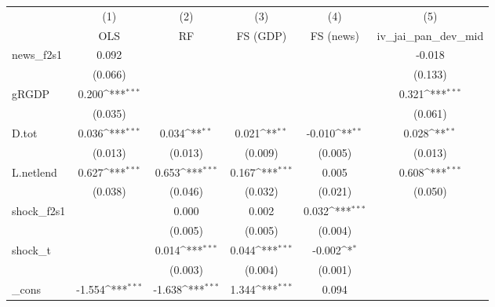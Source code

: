 {
\def\sym#1{\ifmmode^{#1}\else\(^{#1}\)\fi}
\begin{tabular}{l*{5}{c}}
\toprule
            &\multicolumn{1}{c}{(1)}&\multicolumn{1}{c}{(2)}&\multicolumn{1}{c}{(3)}&\multicolumn{1}{c}{(4)}&\multicolumn{1}{c}{(5)}\\
            &\multicolumn{1}{c}{OLS}&\multicolumn{1}{c}{RF}&\multicolumn{1}{c}{FS (GDP)}&\multicolumn{1}{c}{FS (news)}&\multicolumn{1}{c}{iv\_jai\_pan\_dev\_mid}\\
\midrule
news\_f2s1   &       0.092         &                     &                     &                     &      -0.018         \\
            &     (0.066)         &                     &                     &                     &     (0.133)         \\
\addlinespace
gRGDP       &       0.200\sym{***}&                     &                     &                     &       0.321\sym{***}\\
            &     (0.035)         &                     &                     &                     &     (0.061)         \\
\addlinespace
D.tot       &       0.036\sym{***}&       0.034\sym{**} &       0.021\sym{**} &      -0.010\sym{**} &       0.028\sym{**} \\
            &     (0.013)         &     (0.013)         &     (0.009)         &     (0.005)         &     (0.013)         \\
\addlinespace
L.netlend   &       0.627\sym{***}&       0.653\sym{***}&       0.167\sym{***}&       0.005         &       0.608\sym{***}\\
            &     (0.038)         &     (0.046)         &     (0.032)         &     (0.021)         &     (0.050)         \\
\addlinespace
shock\_f2s1  &                     &       0.000         &       0.002         &       0.032\sym{***}&                     \\
            &                     &     (0.005)         &     (0.005)         &     (0.004)         &                     \\
\addlinespace
shock\_t     &                     &       0.014\sym{***}&       0.044\sym{***}&      -0.002\sym{*}  &                     \\
            &                     &     (0.003)         &     (0.004)         &     (0.001)         &                     \\
\addlinespace
\_cons      &      -1.554\sym{***}&      -1.638\sym{***}&       1.344\sym{***}&       0.094         &                     \\

\end{tabular}}
